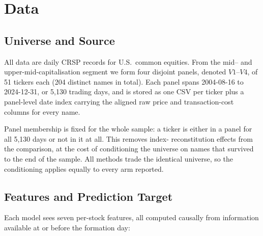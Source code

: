 %
%
%
\providecommand{\text}[1]{\mathrm{#1}}

\section{Data}

\subsection{Universe and Source}

All data are daily CRSP records for U.S.\ common equities. From the
mid-- and upper-mid-capitalisation segment we form four disjoint panels,
denoted $V1$--$V4$, of 51 tickers each (204 distinct names in total). Each
panel spans 2004-08-16 to 2024-12-31, or 5{,}130 trading days, and is
stored as one CSV per ticker plus a panel-level date index carrying the
aligned raw price and transaction-cost columns for every name.

Panel membership is fixed for the whole sample: a ticker is either in a
panel for all 5{,}130 days or not in it at all. This removes index-
reconstitution effects from the comparison, at the cost of conditioning
the universe on names that survived to the end of the sample. All methods
trade the identical universe, so the conditioning applies equally to every
arm reported.

\subsection{Features and Prediction Target}

Each model sees seven per-stock features, all computed causally from
information available at or before the formation day:

